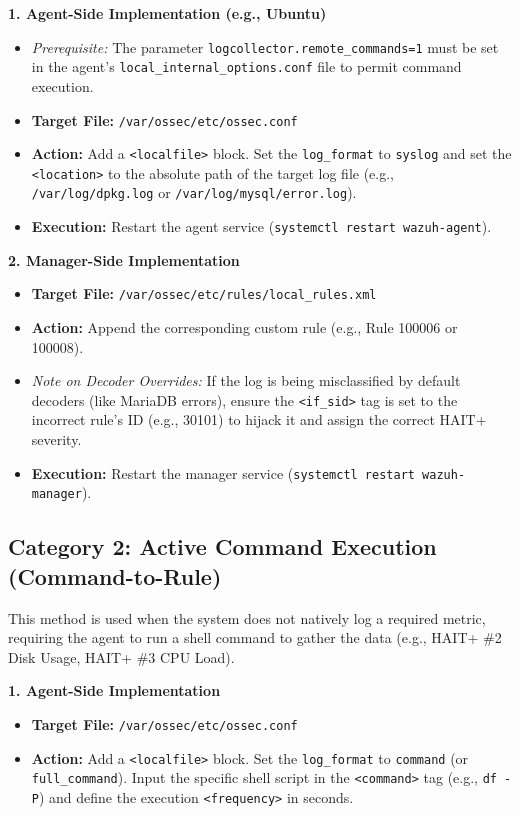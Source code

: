 \textbf{1. Agent-Side Implementation (e.g., Ubuntu)}
\begin{itemize}
    \item \textit{Prerequisite:} The parameter \texttt{logcollector.remote\_commands=1} must be set in the agent's \texttt{local\_internal\_options.conf} file to permit command execution.
    
    \item \textbf{Target File:} \texttt{/var/ossec/etc/ossec.conf}
    \item \textbf{Action:} Add a \texttt{<localfile>} block. Set the \texttt{log\_format} to \texttt{syslog} and set the \texttt{<location>} to the absolute path of the target log file (e.g., \texttt{/var/log/dpkg.log} or \texttt{/var/log/mysql/error.log}).
    \item \textbf{Execution:} Restart the agent service (\texttt{systemctl restart wazuh-agent}).
\end{itemize}

\textbf{2. Manager-Side Implementation}
\begin{itemize}
    \item \textbf{Target File:} \texttt{/var/ossec/etc/rules/local\_rules.xml}
    \item \textbf{Action:} Append the corresponding custom rule (e.g., Rule 100006 or 100008). 
    \item \textit{Note on Decoder Overrides:} If the log is being misclassified by default decoders (like MariaDB errors), ensure the \texttt{<if\_sid>} tag is set to the incorrect rule's ID (e.g., 30101) to hijack it and assign the correct HAIT+ severity.
    \item \textbf{Execution:} Restart the manager service (\texttt{systemctl restart wazuh-manager}).
\end{itemize}

\subsection{Category 2: Active Command Execution (Command-to-Rule)}
This method is used when the system does not natively log a required metric, requiring the agent to run a shell command to gather the data (e.g., HAIT+ \#2 Disk Usage, HAIT+ \#3 CPU Load).

\textbf{1. Agent-Side Implementation}
\begin{itemize}
    \item \textbf{Target File:} \texttt{/var/ossec/etc/ossec.conf}
    \item \textbf{Action:} Add a \texttt{<localfile>} block. Set the \texttt{log\_format} to \texttt{command} (or \texttt{full\_command}). Input the specific shell script in the \texttt{<command>} tag (e.g., \texttt{df -P}) and define the execution \texttt{<frequency>} in seconds.
\end{itemize}

